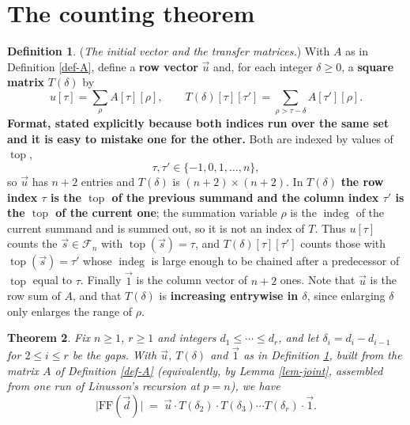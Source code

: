 \documentclass[11pt, a4paper, abstract=yes]{scrartcl}
\theoremstyle{definition}
\newtheorem{definition}{Definition}
\theoremstyle{remark}
\theoremstyle{plain}
\newtheorem{theorem}[definition]{Theorem}
\newcommand{\indeg}{\operatorname{indeg}}
\newcommand{\tp}{\operatorname{top}}
\begin{document}
\section{The counting theorem}
\label{sec-main}
\begin{definition}
(\emph{The initial vector and the transfer matrices.}) With \(A\) as in Definition \ref{def-A}, define a
\textbf{row vector} \(\vec u\) and, for each integer \(\delta\ge0\), a \textbf{square matrix} \(T(\delta)\) by
\begin{equation}\label{eq:def-uT}
  u[\tau]=\sum_{\rho}A[\tau][\rho],
  \qquad
  T(\delta)[\tau][\tau']=\sum_{\rho>\tau-\delta}A[\tau'][\rho].
\end{equation}
\textbf{Format, stated explicitly because both indices run over the same set and it is easy to mistake one
for the other.} Both are indexed by values of \(\tp\),
\begin{equation}\label{eq:def-uT-range}
  \tau,\tau'\in\lbrace-1,0,1,\dots,n\rbrace ,
\end{equation}
so \(\vec u\) has \(n+2\) entries and \(T(\delta)\) is \((n+2)\times(n+2)\). In \(T(\delta)\) \textbf{the row
index \(\tau\) is the \(\tp\) of the previous summand and the column index \(\tau'\) is the \(\tp\) of
the current one}; the summation variable \(\rho\) is the \(\indeg\) of the current summand and is
summed out, so it is not an index of \(T\). Thus \(u[\tau]\) counts the \(\vec s\in\mathcal F_n\)
with \(\tp(\vec s)=\tau\), and \(T(\delta)[\tau][\tau']\) counts those with \(\tp(\vec s)=\tau'\)
whose \(\indeg\) is large enough to be chained after a predecessor of \(\tp\) equal to \(\tau\).
Finally \(\vec 1\) is the column vector of \(n+2\) ones. Note that \(\vec u\) is the row sum of
\(A\), and that \(T(\delta)\) is \textbf{increasing entrywise in \(\delta\)}, since enlarging \(\delta\)
only enlarges the range of \(\rho\).
\label{def-uT}
\end{definition}

\begin{theorem}
Fix \(n\ge1\), \(r\ge1\) and integers \(d_1\le\cdots\le d_r\), and let \(\delta_i=d_i-d_{i-1}\) for
\(2\le i\le r\) be the gaps. With \(\vec u\), \(T(\delta)\) and \(\vec 1\) as in
Definition \ref{def-uT}, built from the matrix \(A\) of Definition \ref{def-A} (equivalently, by
Lemma \ref{lem-joint}, assembled from one run of Linusson's recursion at \(p=n\)), we have
\begin{equation}\label{eq:auto-15}
  \lvert\mathrm{FF}(\vec d)\rvert\;=\;\vec u\cdot T(\delta_2)\cdot T(\delta_3)\cdots T(\delta_r)\cdot\vec 1 .
\end{equation}
\label{thm-main}
\end{theorem}
\end{document}

